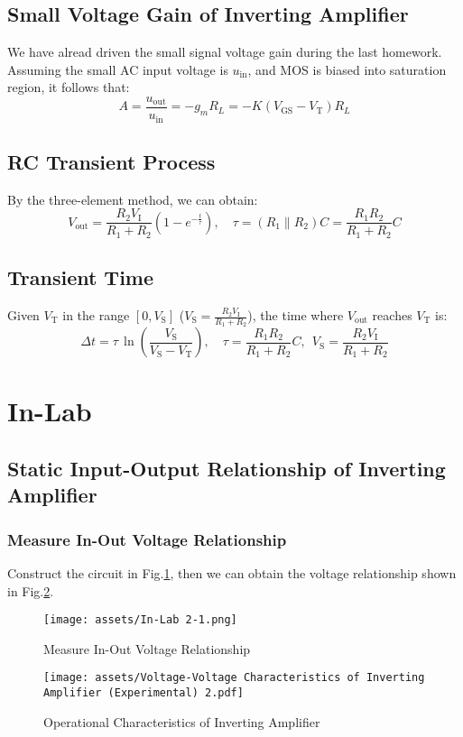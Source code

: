 \documentclass[UTF8]{report}
\theoremstyle{MyLineTheoremStyle} %
\theoremstyle{MyBlockTheoremStyle} %
\theoremstyle{MySubsubsectionStyle} %
\begin{document}
\subsection{Small Voltage Gain of Inverting Amplifier}
We have alread driven the small signal voltage gain during the last homework. Assuming the small AC input voltage is $u_{\text{in}}$, and MOS is biased into saturation region, it follows that:
\begin{equation}
A = \frac{u_{\text{out}}}{u_{\text{in}}} = -g_m R_L = - K \left(V_\text{GS} - V_\text{T}\right)R_L
\end{equation}


\subsection{RC Transient Process}
By the three-element method, we can obtain:
\begin{equation}
V_\text{out} = \frac{R_2 V_\text{I}}{R_1 + R_2} \left( 1 - e^{-\frac{t}{\tau}}\right),\quad \tau = \left(R_1 \parallel R_2 \right) C = \frac{R_1 R_2}{R_1 + R_2} C
\end{equation}
\subsection{Transient Time}
Given $V_\text{T}$ in the range $[0, V_\text{S}]$ ($ V_\text{S} = \frac{R_2 V_{\text{I}}}{R_1 + R_2}$), the time where $V_\text{out}$ reaches $V_\text{T}$ is:
\begin{equation}
\Delta t = \tau \,\ln \left( \frac{V_\text{S}}{V_\text{S} - V_\text{T}} \right),\quad \tau = \frac{R_1 R_2}{R_1 + R_2} C,\ \ V_\text{S} = \frac{R_2 V_{\text{I}}}{R_1 + R_2}
\end{equation}

\section{In-Lab}
\subsection{Static Input-Output Relationship of Inverting Amplifier}
\subsubsection{Measure In-Out Voltage Relationship}\label{sec.voltage}
Construct the circuit in Fig.\ref{In-Lab 2-1}, then we can obtain the voltage relationship shown in Fig.\ref{Operational Characteristics}.
\begin{figure}[H]\centering
    \texttt{[image: assets/In-Lab 2-1.png]}
    \caption{Measure In-Out Voltage Relationship}
    \label{In-Lab 2-1}
\end{figure}
\begin{figure}[H]\centering
    \texttt{[image: assets/Voltage-Voltage Characteristics of Inverting Amplifier (Experimental) 2.pdf]}
    \caption{Operational Characteristics of Inverting Amplifier}
    \label{Operational Characteristics}
\end{figure}
\end{document}
